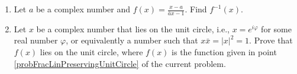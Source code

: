 \begin{enumerate}[ref={\fcProblemRef}]
\item \label{probFracLinPreservingUnitCircle} Let $a$ be a complex number and $\displaystyle f(x)=\frac{x-a}{\bar a x-1}$. Find $f^{-1}(x)$.
\item  Let $x$ be a complex number that lies on the unit circle, i.e., $x=e^{i\varphi}$ for some real number $\varphi$, or equivalently a number such that $ x \bar x = |x|^2 =1$. Prove that $f(x)$ lies on the unit circle, where $f(x)$ is the function given in point \ref{probFracLinPreservingUnitCircle} of the current problem.
\end{enumerate}
